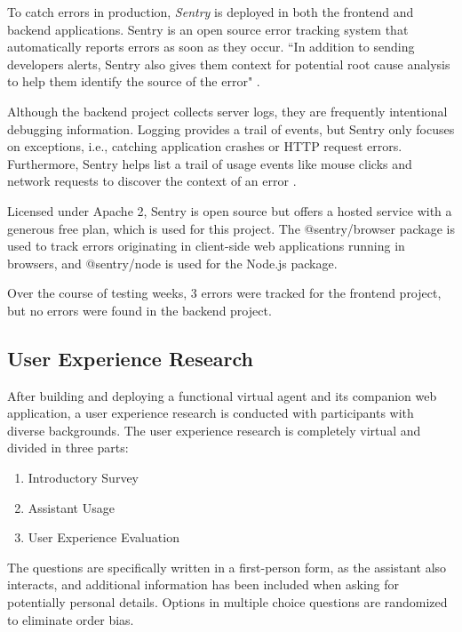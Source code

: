 \documentclass{article}
\begin{document}
To catch errors in production, \emph{Sentry} is deployed in both the frontend and backend applications. Sentry is an open source error tracking system \cite{noauthor_sentry_nodate} that automatically reports errors as soon as they occur. ``In addition to sending developers alerts, Sentry also gives them context for potential root cause analysis to help them identify the source of the error" \cite{noauthor_sentry_nodate-1}.

Although the backend project collects server logs, they are frequently intentional debugging information. Logging provides a trail of events, but Sentry only focuses on exceptions, i.e., catching application crashes or HTTP request errors. Furthermore, Sentry helps list a trail of usage events like mouse clicks and network requests to discover the context of an error \cite{noauthor_sentry_nodate-2}.

Licensed under Apache 2, Sentry is open source but offers a hosted service with a generous free plan, which is used for this project. The @sentry/browser package is used to track errors originating in client-side web applications running in browsers, and @sentry/node is used for the Node.js package.

Over the course of testing weeks, 3 errors were tracked for the frontend project, but no errors were found in the backend project.

\subsection{User Experience Research}

After building and deploying a functional virtual agent and its companion web application, a user experience research is conducted with participants with diverse backgrounds. The user experience research is completely virtual and divided in three parts:

\begin{enumerate}
	\item Introductory Survey
	\item Assistant Usage
	\item User Experience Evaluation
\end{enumerate}

The questions are specifically written in a first-person form, as the assistant also interacts, and additional information has been included when asking for potentially personal details. Options in multiple choice questions are randomized to eliminate order bias.
\end{document}
